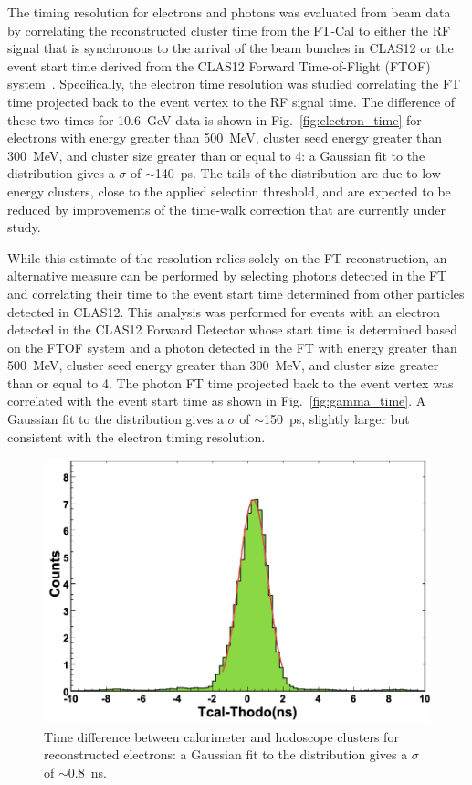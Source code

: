 The timing resolution for electrons and photons was evaluated from beam data by correlating the reconstructed
cluster time from the FT-Cal to either the RF signal that is synchronous to the arrival of the beam bunches in
CLAS12 or the event start time derived from the CLAS12 Forward Time-of-Flight (FTOF) system~\cite{ftof}.
Specifically, the electron time resolution was studied correlating the FT time projected back to the event vertex
to the RF signal time. The difference of these two times for 10.6~GeV data is shown in Fig.~\ref{fig:electron_time}
for electrons with energy greater than 500~MeV, cluster seed energy greater than 300~MeV, and cluster size
greater than or equal to 4: a Gaussian fit to the distribution gives a $\sigma$ of $\sim$140~ps. The tails of the
distribution are due to low-energy clusters, close to the applied selection threshold, and are expected to be reduced
by improvements of the time-walk correction that are currently under study.

While this estimate of the resolution relies solely on the FT reconstruction, an alternative measure can be
performed by selecting photons detected in the FT and correlating their time to the event start time determined
from other particles detected in CLAS12. This analysis was performed for events with an electron detected in
the CLAS12 Forward Detector whose start time is determined based on the FTOF system and a photon detected in
the FT with energy greater than 500~MeV, cluster seed energy greater than 300~MeV, and cluster size greater than
or equal to 4. The photon FT time projected back to the event vertex was correlated with the event start time as
shown in Fig.~\ref{fig:gamma_time}. A Gaussian fit to the distribution gives a $\sigma$ of $\sim$150~ps, slightly
larger but consistent with the electron timing resolution.

\begin{figure}[h]
\includegraphics[height=0.6\columnwidth]{fig/ftcalhodo_time.png}
\caption{Time difference between calorimeter and hodoscope clusters for reconstructed electrons: a Gaussian fit
  to the distribution gives a $\sigma$ of $\sim$0.8~ns.}
\label{fig:ftcalhodo_time}
\end{figure}

